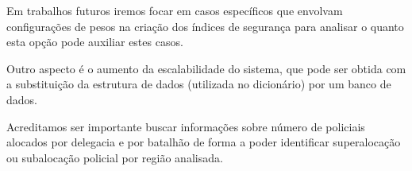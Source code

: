 \documentclass[10pt,conference]{IEEEtran}
\begin{document}
Em trabalhos futuros iremos focar em casos específicos que envolvam configurações de pesos na criação dos índices de segurança para analisar o quanto esta opção pode auxiliar estes casos.

Outro aspecto é o aumento da escalabilidade do sistema, que pode ser obtida com a substituição da estrutura de dados (utilizada no dicionário) por um banco de dados.

Acreditamos ser importante buscar informações sobre número de policiais alocados por delegacia e por batalhão de forma a poder identificar superalocação ou subalocação policial por região analisada.



\newif\ifacks
\acksfalse
\ifacks
\section*{Agradecimentos}
O autor R.H.C.M. agradece o suporte financeiro da CAPES. 
\fi





%
%





\end{document}
